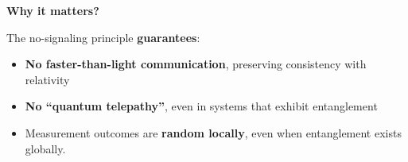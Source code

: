 \highspace
\begin{flushleft}
    \textcolor{Green3}{ \textbf{Why it matters?}}
\end{flushleft}
The no-signaling principle \textbf{guarantees}:
\begin{itemize}[label=\textcolor{Green3}{}]
    \item \textbf{No faster-than-light communication}, preserving consistency with relativity
    \item \textbf{No ``quantum telepathy''}, even in systems that exhibit entanglement
    \item Measurement outcomes are \textbf{random locally}, even when entanglement exists globally.
\end{itemize}